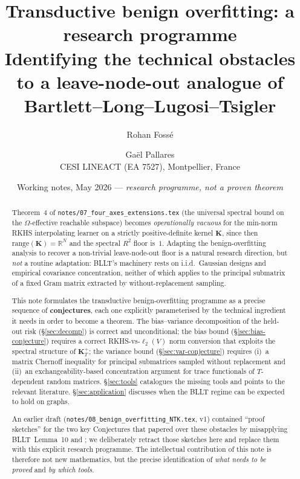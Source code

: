 \documentclass[11pt,a4paper]{article}
\title{\textbf{Transductive benign overfitting: a research programme}\\
\large{Identifying the technical obstacles to a leave-node-out
analogue of Bartlett--Long--Lugosi--Tsigler}}
\author{Rohan Foss\'e \and Ga\"el Pallares\\
\small{CESI LINEACT (EA 7527), Montpellier, France}}
\date{Working notes, May 2026 --- \emph{research programme, not a
proven theorem}}
\theoremstyle{plain}
\theoremstyle{definition}
\theoremstyle{remark}
\newcommand{\bK}{\mathbf{K}}
\newcommand{\R}{\mathbb{R}}
\newcommand{\range}{\mathrm{range}}
\begin{document}
\maketitle

\begin{abstract}
Theorem~4 of \texttt{notes/07\_four\_axes\_extensions.tex} (the
universal spectral bound on the $\Omega$-effective reachable
subspace) becomes \emph{operationally vacuous} for the min-norm
RKHS interpolating learner on a strictly positive-definite kernel
$\bK$, since then $\range(\bK) = \R^N$ and the spectral $R^2$ floor
is~$1$. Adapting the \citet{BartlettLongLugosiTsigler2020}
benign-overfitting analysis to recover a non-trivial leave-node-out
floor is a natural research direction, but \emph{not} a routine
adaptation: BLLT's machinery rests on i.i.d.\ Gaussian designs and
empirical covariance concentration, neither of which applies to the
principal submatrix of a fixed Gram matrix extracted by
without-replacement sampling.

This note formulates the transductive benign-overfitting programme
as a precise sequence of \textbf{conjectures}, each one explicitly
parameterised by the technical ingredient it needs in order to
become a theorem. The bias--variance decomposition of the
held-out risk (\S\ref{sec:decomp}) is correct and unconditional;
the bias bound (\S\ref{sec:bias-conjecture}) requires a correct
RKHS-vs-$\ell_2(V)$ norm conversion that exploits the spectral
structure of $\bK_T^+$; the variance bound (\S\ref{sec:var-conjecture})
requires (i)~a matrix Chernoff inequality for principal submatrices
sampled without replacement and (ii)~an exchangeability-based
concentration argument for trace functionals of $T$-dependent random
matrices. \S\ref{sec:tools} catalogues the missing tools and points
to the relevant literature. \S\ref{sec:application} discusses when
the BLLT regime can be expected to hold on graphs.

An earlier draft (\texttt{notes/08\_benign\_overfitting\_NTK.tex},
v1) contained ``proof sketches'' for the two key Conjectures
that papered over these obstacles by misapplying BLLT~Lemma~10 and
\citet{BardenetMaillard2015}; we deliberately retract those sketches
here and replace them with this explicit research programme. The
intellectual contribution of this note is therefore not new
mathematics, but the precise identification of \emph{what needs to
be proved} and \emph{by which tools}.
\end{abstract}

\tableofcontents
\end{document}
